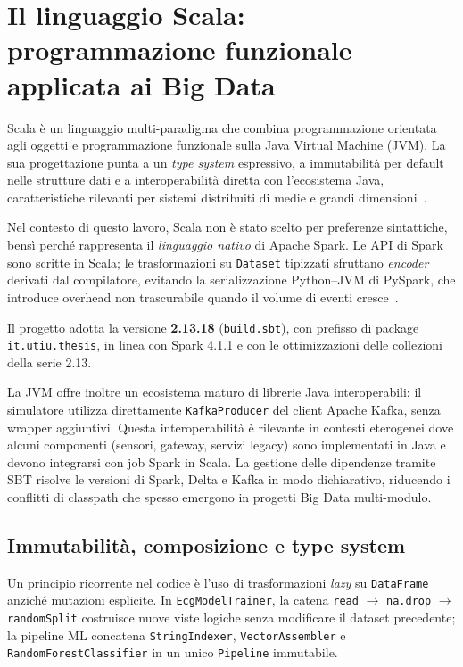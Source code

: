 \section{Il linguaggio Scala: programmazione funzionale applicata ai Big Data}\label{sec:scala}

Scala è un linguaggio multi-paradigma che combina programmazione orientata agli oggetti e programmazione funzionale sulla Java Virtual Machine (JVM).
La sua progettazione punta a un \emph{type system} espressivo, a immutabilità per default nelle strutture dati e a interoperabilità diretta con l'ecosistema Java, caratteristiche rilevanti per sistemi distribuiti di medie e grandi dimensioni~\cite{odersky2008programming}.

Nel contesto di questo lavoro, Scala non è stato scelto per preferenze sintattiche, bensì perché rappresenta il \emph{linguaggio nativo} di Apache Spark.
Le API di Spark sono scritte in Scala; le trasformazioni su \texttt{Dataset} tipizzati sfruttano \emph{encoder} derivati dal compilatore, evitando la serializzazione Python--JVM di PySpark, che introduce overhead non trascurabile quando il volume di eventi cresce~\cite{zaharia2016apache}.

Il progetto adotta la versione \textbf{2.13.18} (\texttt{build.sbt}), con prefisso di package \texttt{it.utiu.thesis}, in linea con Spark 4.1.1 e con le ottimizzazioni delle collezioni della serie 2.13.

La JVM offre inoltre un ecosistema maturo di librerie Java interoperabili: il simulatore utilizza direttamente \texttt{KafkaProducer} del client Apache Kafka, senza wrapper aggiuntivi.
Questa interoperabilità è rilevante in contesti eterogenei dove alcuni componenti (sensori, gateway, servizi legacy) sono implementati in Java e devono integrarsi con job Spark in Scala.
La gestione delle dipendenze tramite SBT risolve le versioni di Spark, Delta e Kafka in modo dichiarativo, riducendo i conflitti di classpath che spesso emergono in progetti Big Data multi-modulo.

\subsection{Immutabilità, composizione e type system}

Un principio ricorrente nel codice è l'uso di trasformazioni \emph{lazy} su \texttt{DataFrame} anziché mutazioni esplicite.
In \texttt{EcgModelTrainer}, la catena \texttt{read} $\rightarrow$ \texttt{na.drop} $\rightarrow$ \texttt{randomSplit} costruisce nuove viste logiche senza modificare il dataset precedente; la pipeline ML concatena \texttt{StringIndexer}, \texttt{VectorAssembler} e \texttt{RandomForestClassifier} in un unico \texttt{Pipeline} immutabile.

